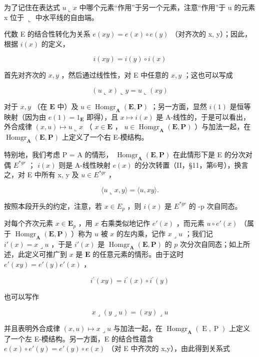 为了记住在表达式 \(u \llcorner x\) 中哪个元素“作用”于另一个元素，注意“作用”于 u 的元素 x 位于 \(\llcorner\) 中水平线的自由端。

代数 E 的结合性转化为关系 \(e(xy) = e(x) \circ e(y)\) （对齐次的 x, y）；因此，根据 \(i(x)\) 的定义，

\[
i (x y) = i (y) \circ i (x)\tag{35}
\]

首先对齐次的 \(x, y\) ，然后通过线性性，对 E 中任意的 \(x, y\) ；这也可以写成

\[
(u \llcorner x) \llcorner y = u \llcorner (x y)\tag{36}
\]

对于 \(x, y\) （在 \(\mathbf{E}\) 中）及 \(u \in \operatorname{Homgr}_{\mathbf{A}}(\mathbf{E}, \mathbf{P})\) ；另一方面，显然 \(i(1)\) 是恒等映射（因为由 \(e(1) = 1_{\mathbf{E}}\) 即得），且 \(x \mapsto i(x)\) 是 A-线性的，于是可以看出，外合成律 \((x, u) \mapsto u \llcorner x\) （ \(x \in \mathbf{E}\) ， \(u \in \operatorname{Homgr}_{\mathbf{A}}(\mathbf{E}, \mathbf{P})\) ）与加法一起，在 \(\operatorname{Homgr}_{\mathbf{A}}(\mathbf{E}, \mathbf{P})\) 上定义了一个右 E-模结构。

特别地，我们考虑 P = A 的情形， \(\operatorname{Homgr}_{\mathbf{A}}(\mathbf{E}, \mathbf{P})\) 在此情形下是 E 的分次对偶 \(E^{*gr}\) ； \(i(x)\) 则是 A-线性映射 \(e(x)\) 的分次转置（II，§11，第6号），换言之，对 E 中所有 x, y 及 \(u \in E^{*gr}\) ，

\[
\langle u \llcorner x, y \rangle = \langle u, x y \rangle .\tag{37}
\]

按照本段开头的约定，注意，若 \(x \in E_{p}\) ，则 \(i(x)\) 是 \(E^{*gr}\) 的 -p 次自同态。

对每个齐次元素 \(x \in \mathbf{E}_p\) ，用 \(x\) 右乘类似地记作 \(e'(x)\) ，而元素 \(u \circ e'(x)\) （属于 \(\operatorname{Homgr}_{\mathbf{A}}(\mathbf{E}, \mathbf{P})\) ）称为 \(u\) 被 \(x\) 的左内乘，记作 \(x \lrcorner u\) ；我们记 \(i'(x) = x \lrcorner u\) ，于是 \(i'(x)\) 是 \(\operatorname{Homgr}_{\mathbf{A}}(\mathbf{E}, \mathbf{P})\) 的 \(p\) 次分次自同态；如上所述，此定义可推广到 \(x\) 是 \(\mathbf{E}\) 的任意元素的情形。由于这时 \(e'(xy) = e'(y)e'(x)\) ，

\[
i ^ {\prime} (x y) = i ^ {\prime} (x) \circ i ^ {\prime} (y)\tag{38}
\]

也可以写作

\[
x \lrcorner (y \lrcorner u) = (x y) \lrcorner u\tag{39}
\]

并且表明外合成律 \((x,u)\mapsto x\lrcorner u\) 与加法一起，在 \(\operatorname{Homgr}_{\mathbf{A}}(\operatorname{E},\operatorname{P})\) 上定义了一个左 E-模结构。另一方面，E 的结合性蕴含 \(e(x)\circ e'(y)=e'(y)\circ e(x)\) （对 E 中齐次的 x,y），由此得到关系式

